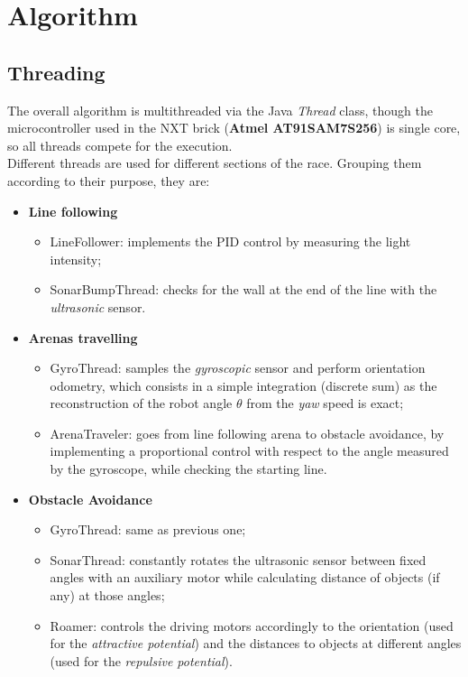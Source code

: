 \documentclass[a4paper,11pt,oneside]{book}
\begin{document}
			
			
			\section{Algorithm}
			\subsection {Threading}
			
			The overall algorithm is multithreaded via the Java \textit{Thread} class, though the microcontroller used in the NXT brick (\textbf{Atmel AT91SAM7S256}) is single core, so all threads compete for the execution.\\
			
			Different threads are used for different sections of the race. Grouping them according to their purpose, they are:
			
			\begin{itemize}
				\item \textbf{Line following}
					\begin{itemize}
							\item LineFollower: implements the PID control by measuring the light intensity;
						\item SonarBumpThread: checks for the wall at the end of the line with the \textit{ultrasonic} sensor.
					\end{itemize}
				
				\item \textbf{Arenas travelling}
				\begin{itemize}
						\item GyroThread: samples the \textit{gyroscopic} sensor and perform orientation odometry, which consists in a simple integration (discrete sum) as the reconstruction of the robot angle $\theta$ from the \textit{yaw} speed is exact;
					\item ArenaTraveler: goes from line following arena to obstacle avoidance, by implementing a proportional control with respect to the angle measured by the gyroscope, while checking the starting line.
				\end{itemize}
			
				
				\item \textbf{Obstacle Avoidance}
				\begin{itemize}
					\item GyroThread: same as previous one;
					\item SonarThread: constantly rotates the ultrasonic sensor between fixed angles with an auxiliary motor while calculating distance of objects (if any) at those angles;
					\item Roamer: controls the driving motors accordingly to the orientation (used for the \textit{attractive potential}) and the distances to objects at different angles (used for the \textit{repulsive potential}).
				\end{itemize}
				
			\end{itemize}
			\vspace{7mm}
			
\end{document}
